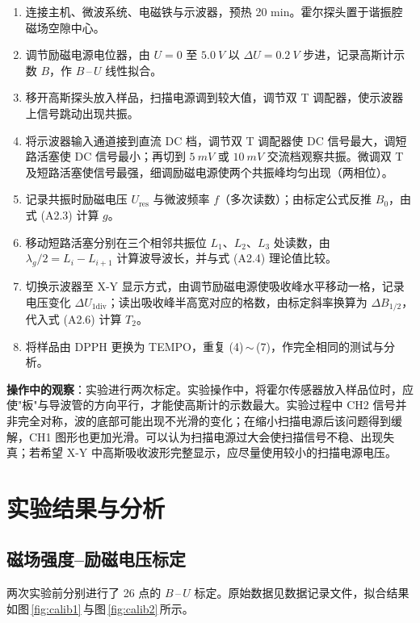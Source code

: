 \documentclass[a4paper,8pt,twocolumn]{article}
\begin{document}
\begin{enumerate}[label=(\arabic*)]
  \item 连接主机、微波系统、电磁铁与示波器，预热 20 min。霍尔探头置于谐振腔磁场空隙中心。
  \item 调节励磁电源电位器，由 $U=0$ 至 $\SI{5.0}{V}$ 以 $\Delta U=\SI{0.2}{V}$ 步进，记录高斯计示数 $B$，作 $B$\,--\,$U$ 线性拟合。
  \item 移开高斯探头放入样品，扫描电源调到较大值，调节双 T 调配器，使示波器上信号跳动出现共振。
  \item 将示波器输入通道接到直流 DC 档，调节双 T 调配器使 DC 信号最大，调短路活塞使 DC 信号最小；再切到 $\SI{5}{mV}$ 或 $\SI{10}{mV}$ 交流档观察共振。微调双 T 及短路活塞使信号最强，细调励磁电源使两个共振峰均匀出现（两相位）。
  \item 记录共振时励磁电压 $U_{\text{res}}$ 与微波频率 $f$（多次读数）；由标定公式反推 $B_0$，由式 (A2.3) 计算 $g$。
  \item 移动短路活塞分别在三个相邻共振位 $L_1$、$L_2$、$L_3$ 处读数，由 $\lambda_g/2 = L_i - L_{i+1}$ 计算波导波长，并与式 (A2.4) 理论值比较。
  \item 切换示波器至 X-Y 显示方式，由调节励磁电源使吸收峰水平移动一格，记录电压变化 $\Delta U_{1\text{div}}$；读出吸收峰半高宽对应的格数，由标定斜率换算为 $\Delta B_{1/2}$，代入式 (A2.6) 计算 $T_2$。
  \item 将样品由 DPPH 更换为 TEMPO，重复 (4)\,$\sim$\,(7)，作完全相同的测试与分析。
\end{enumerate}

\noindent\textbf{操作中的观察}：实验进行两次标定。实验操作中，将霍尔传感器放入样品位时，应使"板"与导波管的方向平行，才能使高斯计的示数最大。实验过程中 CH2 信号并非完全对称，波的底部可能出现不光滑的变化；在缩小扫描电源后该问题得到缓解，CH1 图形也更加光滑。可以认为扫描电源过大会使扫描信号不稳、出现失真；若希望 X-Y 中高斯吸收波形完整显示，应尽量使用较小的扫描电源电压。

\section{实验结果与分析}
\label{sec:results}

\subsection{磁场强度--励磁电压标定}

两次实验前分别进行了 26 点的 $B$\,--\,$U$ 标定。原始数据见数据记录文件，拟合结果如图\,\ref{fig:calib1}\,与图\,\ref{fig:calib2}\,所示。
\end{document}
